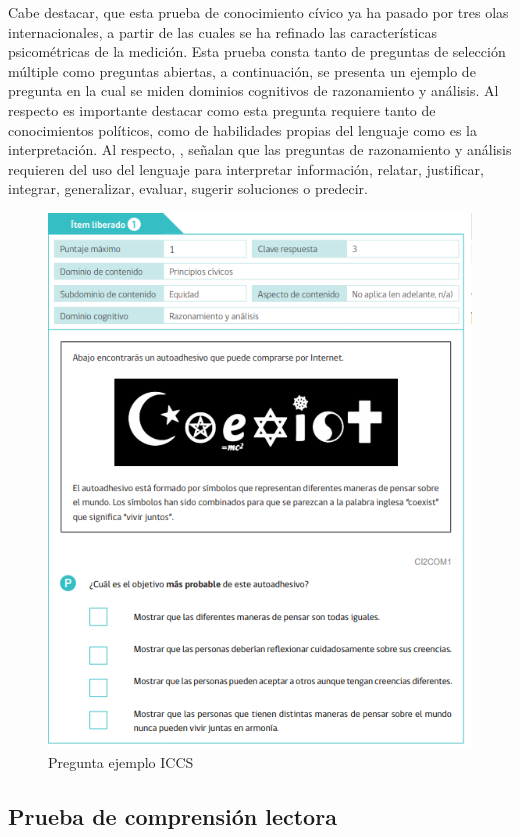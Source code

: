 \documentclass[12pt,twoside]{templates/facsothesis}
\begin{document}
Cabe destacar, que esta prueba de conocimiento cívico ya ha pasado por tres olas internacionales, a partir de las cuales se ha refinado las características psicométricas de la medición. Esta prueba consta tanto de preguntas de selección múltiple como preguntas abiertas, a continuación, se presenta un ejemplo de pregunta en la cual se miden dominios cognitivos de razonamiento y análisis. Al respecto es importante destacar como esta pregunta requiere tanto de conocimientos políticos, como de habilidades propias del lenguaje como es la interpretación. Al respecto, \citet{schulz_Estudio_2011}, señalan que las preguntas de razonamiento y análisis requieren del uso del lenguaje para interpretar información, relatar, justificar, integrar, generalizar, evaluar, sugerir soluciones o predecir.

\begin{figure}

{\centering \includegraphics[width=0.8\linewidth]{images/Pregunta-liberada1} 

}

\caption{Pregunta ejemplo ICCS}\label{fig:unnamed-chunk-4}
\end{figure}

\hypertarget{prueba-de-comprensiuxf3n-lectora}{%
\subsection{Prueba de comprensión lectora}\label{prueba-de-comprensiuxf3n-lectora}}
\end{document}

